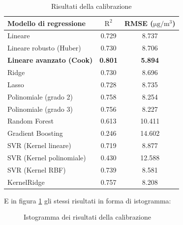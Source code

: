 \begin{table}[H]
    \footnotesize
    \centering
    \begin{tabular}{|l|c|c|}
    \hline
        \textbf{Modello di regressione} & $\bm{\mathrm{R^2}}$ & \textbf{RMSE (}$\mathrm{\si{\micro}g/m^3}$) \\ \hline
        Lineare & 0.729 & 8.737 \\ \hline
        Lineare robusto (Huber) & 0.730 & 8.706 \\ \hline
        \textbf{Lineare avanzato (Cook)} & \textbf{0.801} & \textbf{5.894} \\ \hline
        Ridge & 0.730 & 8.696 \\ \hline
        Lasso & 0.728 & 8.735 \\ \hline
        Polinomiale (grado 2) & 0.758 & 8.254 \\ \hline
        Polinomiale (grado 3) & 0.756 & 8.227 \\ \hline
        Random Forest & 0.613 & 10.411 \\ \hline
        Gradient Boosting & 0.246 & 14.602 \\ \hline
        SVR (Kernel lineare) & 0.719 & 8.877 \\ \hline
        SVR (Kernel polinomiale) & 0.430 & 12.588 \\ \hline
        SVR (Kernel RBF) & 0.739 & 8.581 \\ \hline
        KernelRidge & 0.757 & 8.208 \\ \hline
    \end{tabular}
    \caption{Risultati della calibrazione }
    \label{fig:risultati-pm2.5}
\end{table}

E in figura \ref{fig:risultati-pm2.5-hist} gli stessi risultati in forma di istogramma:

\begin{figure}[H]%
    \centering
    \captionsetup{justification=centering}
    \caption{Istogramma dei risultati della calibrazione }%
    \label{fig:risultati-pm2.5-hist}%
\end{figure}

